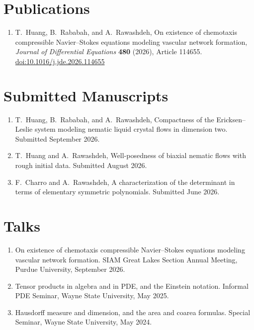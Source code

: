 \documentclass[11pt]{article}
\begin{document}
\section{Publications}
\begin{enumerate}[leftmargin=1.6em]
  \item T.~Huang, B.~Rababah, and A.~Rawashdeh, On existence of chemotaxis compressible Navier--Stokes
        equations modeling vascular network formation, \emph{Journal of Differential Equations}
        \textbf{480} (2026), Article 114655. \href{https://doi.org/10.1016/j.jde.2026.114655}{doi:10.1016/j.jde.2026.114655}
\end{enumerate}

\section{Submitted Manuscripts}
\begin{enumerate}[leftmargin=1.6em]
  \item T.~Huang, B.~Rababah, and A.~Rawashdeh, Compactness of the Ericksen--Leslie system modeling
        nematic liquid crystal flows in dimension two. Submitted September 2026.
  \item T.~Huang and A.~Rawashdeh, Well-posedness of biaxial nematic flows with rough initial data.
        Submitted August 2026.
  \item F.~Charro and A.~Rawashdeh, A characterization of the determinant in terms of elementary
        symmetric polynomials. Submitted June 2026.
\end{enumerate}

\section{Talks}
\begin{enumerate}[leftmargin=1.6em]
  \item On existence of chemotaxis compressible Navier--Stokes equations modeling vascular network
        formation. SIAM Great Lakes Section Annual Meeting, Purdue University, September 2026.
  \item Tensor products in algebra and in PDE, and the Einstein notation. Informal PDE Seminar,
        Wayne State University, May 2025.
  \item Hausdorff measure and dimension, and the area and coarea formulas. Special Seminar,
        Wayne State University, May 2024.
\end{enumerate}
\end{document}
